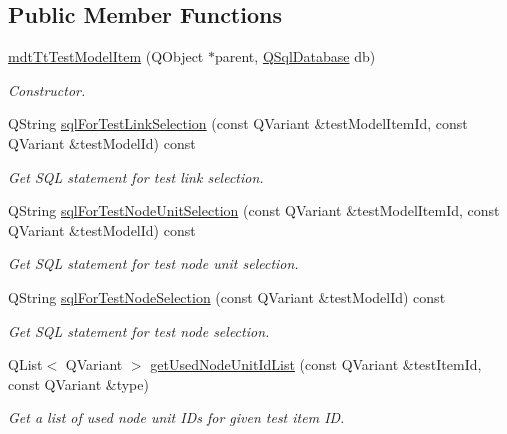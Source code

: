 \subsection*{Public Member Functions}
\begin{DoxyCompactItemize}
\item 
\hyperlink{classmdt_tt_test_model_item_aa410b11d0b8f92dda5e0317f1ecd33ca}{mdt\-Tt\-Test\-Model\-Item} (Q\-Object $\ast$parent, \hyperlink{class_q_sql_database}{Q\-Sql\-Database} db)
\begin{DoxyCompactList}\small\item\em Constructor. \end{DoxyCompactList}\item 
Q\-String \hyperlink{classmdt_tt_test_model_item_af55369643e6640544384ebf0f1b9782e}{sql\-For\-Test\-Link\-Selection} (const Q\-Variant \&test\-Model\-Item\-Id, const Q\-Variant \&test\-Model\-Id) const 
\begin{DoxyCompactList}\small\item\em Get S\-Q\-L statement for test link selection. \end{DoxyCompactList}\item 
Q\-String \hyperlink{classmdt_tt_test_model_item_ad9556478313d628d6b9b505137fc318e}{sql\-For\-Test\-Node\-Unit\-Selection} (const Q\-Variant \&test\-Model\-Item\-Id, const Q\-Variant \&test\-Model\-Id) const 
\begin{DoxyCompactList}\small\item\em Get S\-Q\-L statement for test node unit selection. \end{DoxyCompactList}\item 
Q\-String \hyperlink{classmdt_tt_test_model_item_a7a69b5c9d52fd3d6c8c78d16b86d1165}{sql\-For\-Test\-Node\-Selection} (const Q\-Variant \&test\-Model\-Id) const 
\begin{DoxyCompactList}\small\item\em Get S\-Q\-L statement for test node selection. \end{DoxyCompactList}\item 
Q\-List$<$ Q\-Variant $>$ \hyperlink{classmdt_tt_test_model_item_a0666954f17eab46ef9ef974542486446}{get\-Used\-Node\-Unit\-Id\-List} (const Q\-Variant \&test\-Item\-Id, const Q\-Variant \&type)
\begin{DoxyCompactList}\small\item\em Get a list of used node unit I\-Ds for given test item I\-D. \end{DoxyCompactList}\item 

\end{DoxyCompactItemize}
